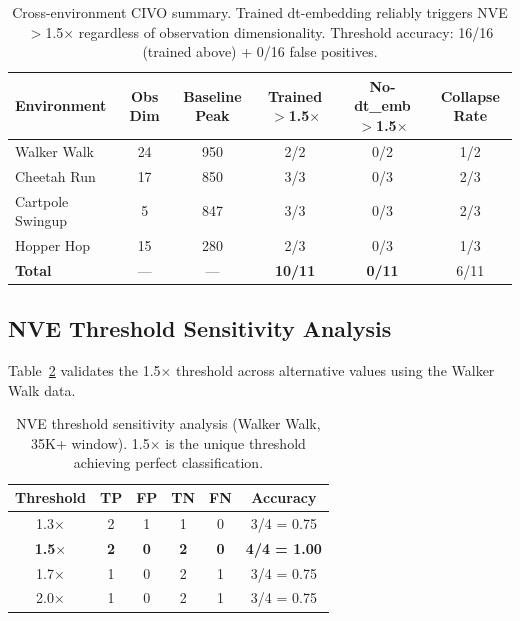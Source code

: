 \documentclass[10pt,letterpaper]{article}
\begin{document}
\begin{table}[h]
\centering
\caption{Cross-environment CIVO summary. Trained dt-embedding reliably triggers NVE$>$1.5$\times$ regardless of observation dimensionality. Threshold accuracy: 16/16 (trained above) + 0/16 false positives.}
\label{tab:cross_env}
\begin{tabular}{lccccc}
\toprule
\textbf{Environment} & \textbf{Obs Dim} & \textbf{Baseline Peak} & \textbf{Trained $>$1.5$\times$} & \textbf{No-dt\_emb $>$1.5$\times$} & \textbf{Collapse Rate} \\
\midrule
Walker Walk & 24 & 950 & 2/2 & 0/2 & 1/2 \\
Cheetah Run & 17 & 850 & 3/3 & 0/3 & 2/3 \\
Cartpole Swingup & 5 & 847 & 3/3 & 0/3 & 2/3 \\
Hopper Hop & 15 & 280 & 2/3 & 0/3 & 1/3 \\
\midrule
\textbf{Total} & --- & --- & \textbf{10/11} & \textbf{0/11} & 6/11 \\
\bottomrule
\end{tabular}
\end{table}

\subsection{NVE Threshold Sensitivity Analysis}

Table~\ref{tab:threshold} validates the 1.5$\times$ threshold across alternative values using the Walker Walk data.

\begin{table}[h]
\centering
\caption{NVE threshold sensitivity analysis (Walker Walk, 35K+ window). 1.5$\times$ is the unique threshold achieving perfect classification.}
\label{tab:threshold}
\begin{tabular}{cccccc}
\toprule
\textbf{Threshold} & \textbf{TP} & \textbf{FP} & \textbf{TN} & \textbf{FN} & \textbf{Accuracy} \\
\midrule
1.3$\times$ & 2 & 1 & 1 & 0 & 3/4 = 0.75 \\
\textbf{1.5$\times$} & \textbf{2} & \textbf{0} & \textbf{2} & \textbf{0} & \textbf{4/4 = 1.00} \\
1.7$\times$ & 1 & 0 & 2 & 1 & 3/4 = 0.75 \\
2.0$\times$ & 1 & 0 & 2 & 1 & 3/4 = 0.75 \\
\bottomrule
\end{tabular}
\end{table}
\end{document}
